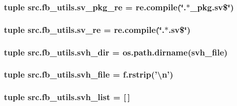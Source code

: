 \hypertarget{namespacesrc_1_1fb__utils_a266877c1370ada613f730519fd34b9d7}{
\subsubsection[{sv\-\_\-pkg\-\_\-re}]{\setlength{\rightskip}{0pt plus 5cm}tuple src.\-fb\-\_\-utils.\-sv\-\_\-pkg\-\_\-re = re.\-compile(\char`\"{}.$\ast$\-\_\-pkg.\-sv\$\char`\"{})}}\label{namespacesrc_1_1fb__utils_a266877c1370ada613f730519fd34b9d7}
\hypertarget{namespacesrc_1_1fb__utils_a6bfea0b85351ac8f7f08a890fddf6fb7}{
\subsubsection[{sv\-\_\-re}]{\setlength{\rightskip}{0pt plus 5cm}tuple src.\-fb\-\_\-utils.\-sv\-\_\-re = re.\-compile(\char`\"{}.$\ast$.sv\$\char`\"{})}}\label{namespacesrc_1_1fb__utils_a6bfea0b85351ac8f7f08a890fddf6fb7}
\hypertarget{namespacesrc_1_1fb__utils_a715aba9608eaec84c52cf1ab50a3f061}{
\subsubsection[{svh\-\_\-dir}]{\setlength{\rightskip}{0pt plus 5cm}tuple src.\-fb\-\_\-utils.\-svh\-\_\-dir = os.\-path.\-dirname({\bf svh\-\_\-file})}}\label{namespacesrc_1_1fb__utils_a715aba9608eaec84c52cf1ab50a3f061}
\hypertarget{namespacesrc_1_1fb__utils_a9cf6dcc0e62293c0087385b32e64737c}{
\subsubsection[{svh\-\_\-file}]{\setlength{\rightskip}{0pt plus 5cm}tuple src.\-fb\-\_\-utils.\-svh\-\_\-file = f.\-rstrip('\textbackslash{}n')}}\label{namespacesrc_1_1fb__utils_a9cf6dcc0e62293c0087385b32e64737c}
\hypertarget{namespacesrc_1_1fb__utils_af652a83d9c7ea441da07100ce81e0795}{
\subsubsection[{svh\-\_\-list}]{\setlength{\rightskip}{0pt plus 5cm}tuple src.\-fb\-\_\-utils.\-svh\-\_\-list = \mbox{[}$\,$\mbox{]}}}\label{namespacesrc_1_1fb__utils_af652a83d9c7ea441da07100ce81e0795}
